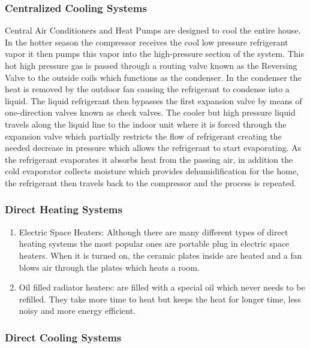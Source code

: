 \documentclass{sig-alternate}
\begin{document}
\subsubsection{Centralized Cooling Systems} 

 Central Air Conditioners and Heat Pumps are designed to cool the entire house. In the hotter season the compressor receives the cool low pressure refrigerant vapor it then pumps this vapor into the high-pressure section of the system. This hot high pressure gas is passed through a routing valve known as the Reversing Valve to the outside coils which functions as the condenser. In the condenser the heat is removed by the outdoor fan causing the refrigerant to condense into a liquid. The liquid refrigerant then bypasses the first expansion valve by means of one-direction valves known as check valves. The cooler but high pressure liquid travels along the liquid line to the indoor unit where it is forced through the expansion valve which partially restricts the flow of refrigerant creating the needed decrease in pressure which allows the refrigerant to start evaporating. As the refrigerant evaporates it absorbs heat from the passing air, in addition the cold evaporator collects moisture which provides dehumidification for the home, the refrigerant then travels back to the compressor and the process is repeated.  
   
\subsubsection{Direct Heating Systems}

\begin{enumerate}

\item Electric Space Heaters: Although there are many different types of direct heating systems the most popular ones are portable plug in electric space heaters. When it is turned on, the ceramic plates inside are heated and a fan blows air through the plates which heats a room.

\item Oil filled radiator heaters:  are filled with a special oil which never needs to be refilled. They take more time to heat but keeps the heat for longer time, less noisy and more energy efficient. 
\end{enumerate} 
\subsubsection{Direct Cooling Systems}
\end{document}
